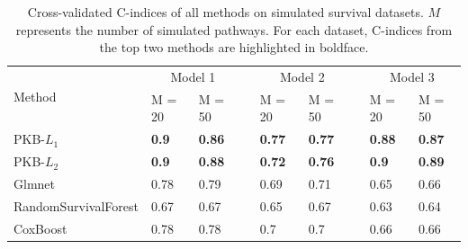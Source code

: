 \documentclass[a4paper,12pt]{article}
\begin{document}
\newpage
\begin{table}[htp]
	\centering
	\begin{tabular}{lllllllll}
		\hline
		\multirow{2}{*}{Method} & \multicolumn{2}{c}{Model 1}  & \multicolumn{1}{c}{} & \multicolumn{2}{c}{Model 2}   & \multicolumn{1}{c}{} & \multicolumn{2}{c}{Model 3}   \\ \cline{2-9} 
		& M = 20       & M = 50        &                      & M = 20        & M = 50        &                      & M = 20        & M = 50        \\ \hline
		PKB-$L_1$                  & \textbf{0.9} & \textbf{0.86} & \textbf{}            & \textbf{0.77} & \textbf{0.77} & \textbf{}            & \textbf{0.88} & \textbf{0.87} \\
		PKB-$L_2$                 & \textbf{0.9} & \textbf{0.88} & \textbf{}            & \textbf{0.72} & \textbf{0.76} & \textbf{}            & \textbf{0.9}  & \textbf{0.89} \\
		Glmnet                  & 0.78         & 0.79          &                      & 0.69          & 0.71          &                      & 0.65          & 0.66          \\
		RandomSurvivalForest    & 0.67         & 0.67          &                      & 0.65          & 0.67          &                      & 0.63          & 0.64          \\
		CoxBoost                & 0.78         & 0.78          &                      & 0.7          & 0.7          &                      & 0.66          & 0.66          \\ \hline
	\end{tabular}
	\caption{Cross-validated C-indices of all methods on simulated survival datasets. $M$ represents the number of simulated pathways. For each dataset, C-indices from the top two methods are highlighted in boldface.}
	\label{tab:simu_surv}
\end{table}

\newpage
\end{document}
